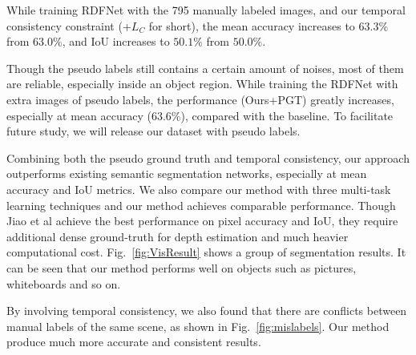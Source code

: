  While training RDFNet with the 795 manually labeled images, and our temporal consistency constraint (+$L_C$ for short), the mean accuracy increases to $63.3\%$ from $63.0\%$, and IoU increases to $50.1\%$ from $50.0\%$.


Though the pseudo labels still contains a certain amount of noises, most of them are reliable, especially inside an object region. 
%
While training the RDFNet with extra images of pseudo labels, the performance (Ours+PGT) greatly increases, especially at mean accuracy ($63.6\%$), compared with the baseline.
%
To facilitate future study, we will release our dataset with pseudo labels.
%

Combining both the pseudo ground truth and temporal consistency, our approach outperforms existing semantic segmentation networks, especially at mean accuracy and IoU metrics. 
We also compare our method with three multi-task learning techniques and our method achieves comparable performance.
%
Though Jiao et al achieve the best performance on pixel accuracy and IoU, they require additional dense ground-truth for depth estimation and much heavier computational cost.
%
Fig.~\ref{fig:VisResult} shows a group of segmentation results. It can be seen that our method performs well on objects such as pictures, whiteboards and so on. 
%



 By involving temporal consistency, we also found that there are conflicts between manual labels of the same scene, as shown in Fig.~\ref{fig:mislabels}. Our method produce much more accurate and consistent results.



